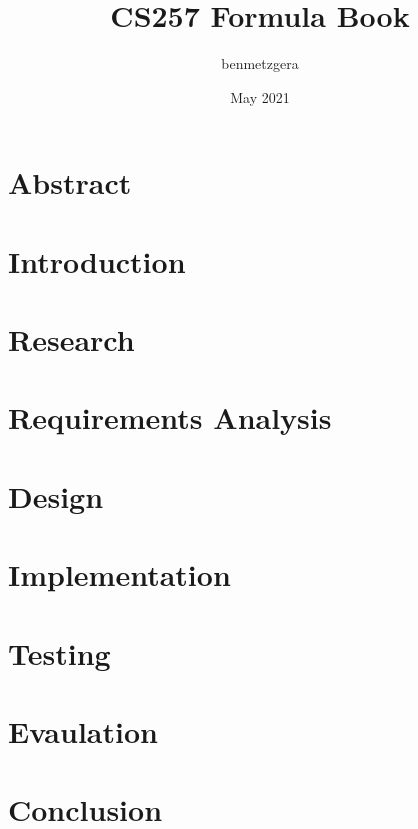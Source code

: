 \documentclass{article}
\title{CS257 Formula Book}
\author{benmetzgera }
\date{May 2021}
\begin{document}
\section{Abstract}

\section{Introduction}

\section{Research}

\section{Requirements Analysis}

\section{Design}

\section{Implementation}

\section{Testing}

\section{Evaulation}

\section{Conclusion}



\end{document}
